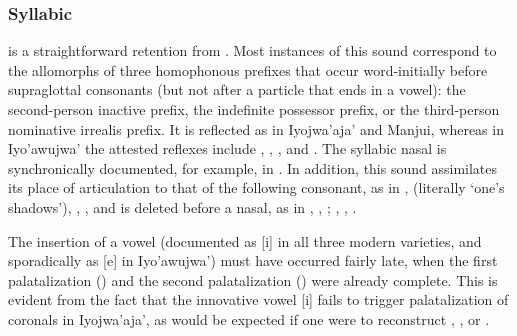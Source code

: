 \subsubsection{Syllabic }\label{ch-nn}

 is a straightforward retention from . Most instances of this sound correspond to the allomorphs of three homophonous prefixes that occur word-initially before supraglottal consonants (but not after a particle that ends in a vowel): the second-person inactive prefix, the indefinite possessor prefix, or the third-person nominative irrealis prefix. It is reflected as  in Iyojwa’aja’ and Manjui, whereas in Iyo’awujwa’ the attested reflexes include , , , and . The syllabic nasal is synchronically documented, for example, in  \citep[69]{AG83}. In addition, this sound assimilates its place of articulation to that of the following consonant, as in ,  (literally `one's shadows'), , , and is deleted before a nasal, as in , , ; , ,  \citep[75--79]{JC14a,AG83}.

The insertion of a vowel (documented as [i] in all three modern varieties, and sporadically as [e] in Iyo’awujwa’) must have occurred fairly late, when the first palatalization () and the second palatalization () were already complete. This is evident from the fact that the innovative vowel [i] fails to trigger palatalization of coronals in Iyojwa’aja’, as would be expected if one were to reconstruct , , or .

\begin{exe}
    \ex {}
    \ex {}
    \ex {}
    \ex {}
    \ex {}
    \ex {}
\end{exe}


